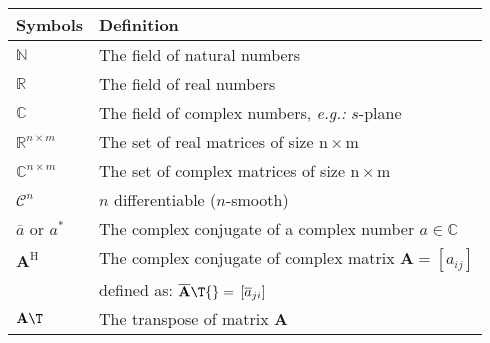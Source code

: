 \begin{singlespace}
\begin{flushleft}
\begin{longtable}{ll}
\hline
\textbf{Symbols} & \textbf{Definition} \\
\hline\hline
%
$\mathbb{N}$& The field of natural numbers\\
%
$\mathbb{R}$& The field of real numbers\\
%
$\mathbb{C}$& The field of complex numbers, \emph{e.g.:} $s$-plane\\ 
%
$\mathbb{R}^{n \times m}$& The set of real matrices of size $\mathrm{n \times m}$\\  
%
$\mathbb{C}^{n \times m}$& The set of complex matrices of size $\mathrm{n \times m}$\\
%
$\mathcal{C}^n$     &   $n$ differentiable ($n$-smooth) \\
%
$\overline{a}$ or $a^\ast$  &The complex conjugate of a complex number $ a \in \mathbb{C}$ \\
%
$\mathbf{A}^\mathrm{H}$&  The complex conjugate of complex matrix 
$\mathbf{A} = \left[a_{ij}\right]$\\ 
&defined as: $\overline{\mathbf{A}}\T{}={}\left[\overline{a}_{ji}\right]$\\		
%
$\mathbf{A}\T$&  The transpose of matrix $\mathbf{A}$\\
%
%
\hline
\end{longtable}
\end{flushleft}
\end{singlespace}
\vfill